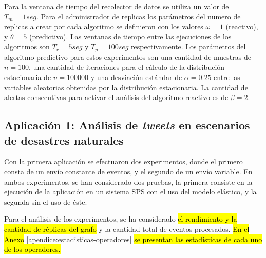 Para la ventana de tiempo del recolector de datos se utiliza un valor de $T_m = 1seg$. Para el administrador de replicas los parámetros del numero de replicas a crear por cada algoritmo se definieron con los valores $\omega = 1$ (reactivo), y $\theta = 5$ (predictivo). Las ventanas de tiempo entre las ejecuciones de los algoritmos son $T_r = 5seg$ y $T_p = 100seg$ respectivamente. Los parámetros del algoritmo predictivo para estos experimentos son una cantidad de muestras de $n = 100$, una cantidad de iteraciones para el cálculo de la distribución estacionaria de $\upsilon = 100000$ y una desviación estándar de $\alpha = 0.25$ entre las variables aleatorias obtenidas por la distribución estacionaria. La cantidad de alertas consecutivas para activar el análisis del algoritmo reactivo es de $\beta = 2$.

\subsection{Aplicación 1: Análisis de \textit{tweets} en escenarios de desastres naturales}
Con la primera aplicación se efectuaron dos experimentos, donde el primero consta de un envío constante de eventos, y el segundo de un envío variable. En ambos experimentos, se han considerado dos pruebas, la primera consiste en la ejecución de la aplicación en un sistema SPS con el uso del modelo elástico, y la segunda sin el uso de éste.


Para el análisis de los experimentos, se ha considerado \hl{el rendimiento y la cantidad de réplicas del grafo} y la cantidad total de eventos procesados. \hl{En el Anexo} \ref{apendice:estadisticas-operadores} \hl{se presentan las estadísticas de cada uno de los operadores.}



